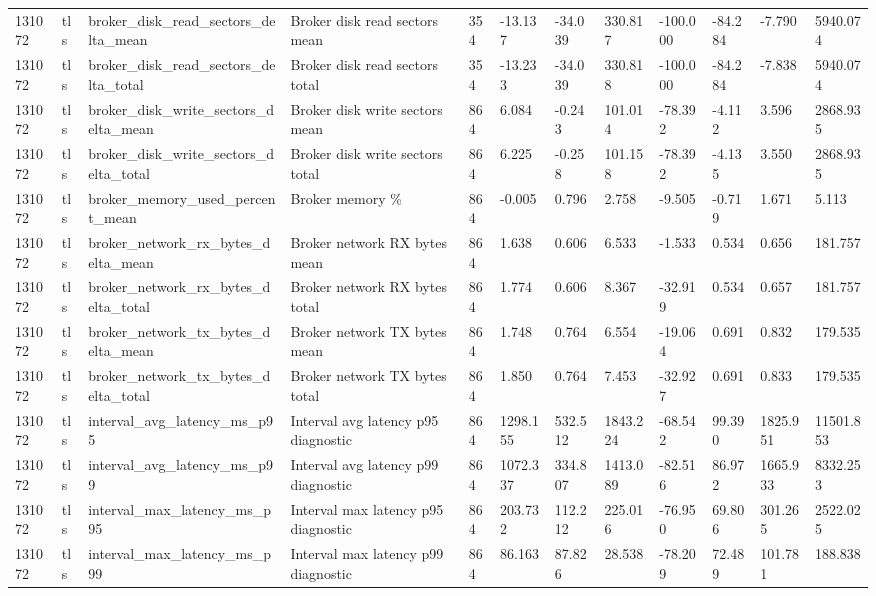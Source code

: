 \begin{longtable}{llllllllllll}
131072 & tls & broker\_disk\_read\_sectors\_delta\_mean & Broker disk read sectors mean & 354 & -13.137 & -34.039 & 330.817 & -100.000 & -84.284 & -7.790 & 5940.074 \\
131072 & tls & broker\_disk\_read\_sectors\_delta\_total & Broker disk read sectors total & 354 & -13.233 & -34.039 & 330.818 & -100.000 & -84.284 & -7.838 & 5940.074 \\
131072 & tls & broker\_disk\_write\_sectors\_delta\_mean & Broker disk write sectors mean & 864 & 6.084 & -0.243 & 101.014 & -78.392 & -4.112 & 3.596 & 2868.935 \\
131072 & tls & broker\_disk\_write\_sectors\_delta\_total & Broker disk write sectors total & 864 & 6.225 & -0.258 & 101.158 & -78.392 & -4.135 & 3.550 & 2868.935 \\
131072 & tls & broker\_memory\_used\_percent\_mean & Broker memory \% & 864 & -0.005 & 0.796 & 2.758 & -9.505 & -0.719 & 1.671 & 5.113 \\
131072 & tls & broker\_network\_rx\_bytes\_delta\_mean & Broker network RX bytes mean & 864 & 1.638 & 0.606 & 6.533 & -1.533 & 0.534 & 0.656 & 181.757 \\
131072 & tls & broker\_network\_rx\_bytes\_delta\_total & Broker network RX bytes total & 864 & 1.774 & 0.606 & 8.367 & -32.919 & 0.534 & 0.657 & 181.757 \\
131072 & tls & broker\_network\_tx\_bytes\_delta\_mean & Broker network TX bytes mean & 864 & 1.748 & 0.764 & 6.554 & -19.064 & 0.691 & 0.832 & 179.535 \\
131072 & tls & broker\_network\_tx\_bytes\_delta\_total & Broker network TX bytes total & 864 & 1.850 & 0.764 & 7.453 & -32.927 & 0.691 & 0.833 & 179.535 \\
131072 & tls & interval\_avg\_latency\_ms\_p95 & Interval avg latency p95 diagnostic & 864 & 1298.155 & 532.512 & 1843.224 & -68.542 & 99.390 & 1825.951 & 11501.853 \\
131072 & tls & interval\_avg\_latency\_ms\_p99 & Interval avg latency p99 diagnostic & 864 & 1072.337 & 334.807 & 1413.089 & -82.516 & 86.972 & 1665.933 & 8332.253 \\
131072 & tls & interval\_max\_latency\_ms\_p95 & Interval max latency p95 diagnostic & 864 & 203.732 & 112.212 & 225.016 & -76.950 & 69.806 & 301.265 & 2522.025 \\
131072 & tls & interval\_max\_latency\_ms\_p99 & Interval max latency p99 diagnostic & 864 & 86.163 & 87.826 & 28.538 & -78.209 & 72.489 & 101.781 & 188.838 \\

\end{longtable}
